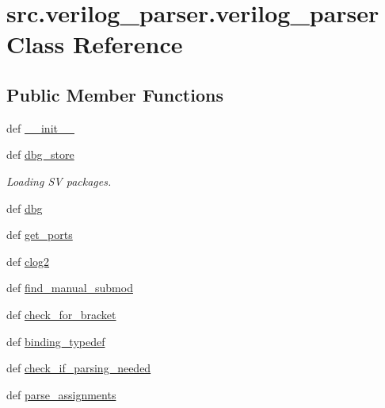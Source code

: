 \hypertarget{classsrc_1_1verilog__parser_1_1verilog__parser}{\section{src.\-verilog\-\_\-parser.\-verilog\-\_\-parser Class Reference}
\label{classsrc_1_1verilog__parser_1_1verilog__parser}
}
\subsection*{Public Member Functions}
\begin{DoxyCompactItemize}
\item 
def \hyperlink{classsrc_1_1verilog__parser_1_1verilog__parser_a5841508e2d8cfccaebfe162fe72e4d03}{\-\_\-\-\_\-init\-\_\-\-\_\-}
\item 
def \hyperlink{classsrc_1_1verilog__parser_1_1verilog__parser_acb8bc8dd21dc57dd3562f02efc76b7be}{dbg\-\_\-store}
\begin{DoxyCompactList}\small\item\em Loading S\-V packages. \end{DoxyCompactList}\item 
def \hyperlink{classsrc_1_1verilog__parser_1_1verilog__parser_a9458eb4df7beb0eda268a69b82f6e379}{dbg}
\item 
def \hyperlink{classsrc_1_1verilog__parser_1_1verilog__parser_a27b563239157cc0e3e8b41ae3b141280}{get\-\_\-ports}
\item 
def \hyperlink{classsrc_1_1verilog__parser_1_1verilog__parser_a6a35e0559edeb8429687caa189b15fe5}{clog2}
\item 
def \hyperlink{classsrc_1_1verilog__parser_1_1verilog__parser_ae00350e04e9bc19aa31e843c571361d2}{find\-\_\-manual\-\_\-submod}
\item 
def \hyperlink{classsrc_1_1verilog__parser_1_1verilog__parser_a2266112da05de7273c1f91d5a3148d51}{check\-\_\-for\-\_\-bracket}
\item 
def \hyperlink{classsrc_1_1verilog__parser_1_1verilog__parser_ae54a1ce303f44299d7ba906d1354e7d1}{binding\-\_\-typedef}
\item 
def \hyperlink{classsrc_1_1verilog__parser_1_1verilog__parser_a922d64b3c8d19d0833a91fe5dfaedc23}{check\-\_\-if\-\_\-parsing\-\_\-needed}
\item 
def \hyperlink{classsrc_1_1verilog__parser_1_1verilog__parser_a7837590371670e9004e352a113fe1f6c}{parse\-\_\-assignments}
\item 

\end{DoxyCompactItemize}
